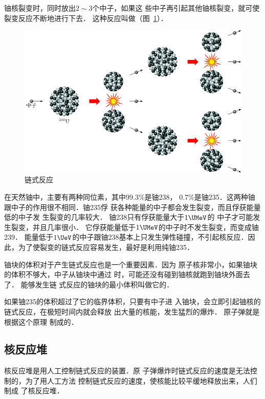铀核裂变时，同时放出$2 \sim 3$个中子，如果这
些中子再引起其他铀核裂变，就可使裂变反应不断地进行下去．
这种反应叫做（图~\ref{fig_C_9-13}）．

\begin{figure}[htbp]
    \centering
    \includegraphics{fig/C/9-13.pdf}
    \caption{链式反应}\label{fig_C_9-13}
\end{figure}


在天然铀中，主要有两种同位素，其中99.3\%是铀238，
0.7\%是铀235．这两种铀跟中子的作用很不相同．铀235俘
获各种能量的中子都会发生裂变，而且俘获能量低的中子发
生裂变的几率较大．
铀238只有俘获能量大于$1 \UMeV$的
中子才可能发生裂变，并且几率很小．
它俘获能量低于$1 \UMeV$的中子时不发生裂变，而变成铀239．
能量低于$1 \UeV$的中子跟铀238基本上只发生弹性碰撞，不引起核反应．因
此，为了使裂变的链式反应容易发生，最好是利用纯铀235．

铀块的体积对于产生链式反应也是一个重要因素．因为
原子核非常小，如果铀块的体积不够大，中子从铀块中通过
时，可能还没有碰到铀核就跑到铀块外面去了．
能够发生链
式反应的铀块的最小体积叫做它的．

如果铀235的体积超过了它的临界体积，只要有中子进
入铀块，会立即引起铀核的链式反应，在极短时间内就会释放
出大量的核能，发生猛烈的爆炸．
原子弹就是根据这个原理
制成的．

\subsection{核反应堆}

核反应堆是用人工控制链式反应的装置．原
子弹爆炸时链式反应的速度是无法控制的，为了用人工方法
控制链式反应的速度，使核能比较平缓地释放出来，人们制成
了核反应堆．


